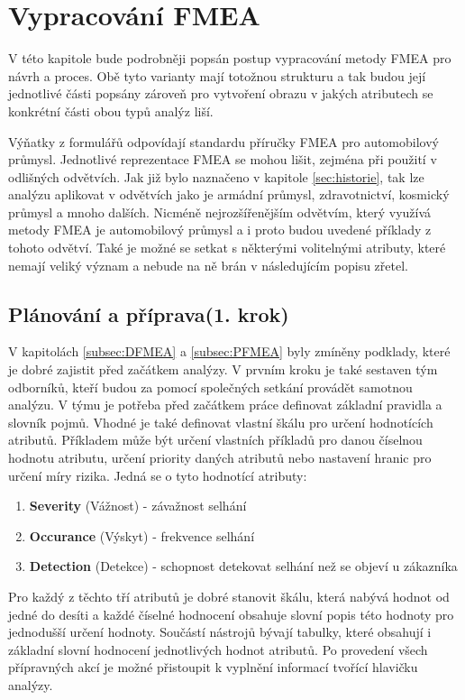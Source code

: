\chapter{Vypracování FMEA }
\label{sec:FMEA_postup}
V této kapitole bude podrobněji popsán postup vypracování metody FMEA pro návrh a proces. Obě tyto varianty mají totožnou strukturu a tak budou její jednotlivé části popsány zároveň pro vytvoření obrazu v jakých atributech se konkrétní části obou typů analýz liší. 

Výňatky z formulářů odpovídají standardu příručky FMEA pro automobilový průmysl. \cite{fmeaHandbook} Jednotlivé reprezentace FMEA se mohou lišit, zejména při použití v odlišných odvětvích. Jak již bylo naznačeno v kapitole \ref{sec:historie}, tak lze analýzu aplikovat v odvětvích jako je armádní průmysl, zdravotnictví, kosmický průmysl a mnoho dalších. Nicméně nejrozšířenějším odvětvím, který využívá metody FMEA je automobilový průmysl a i proto budou uvedené příklady z tohoto odvětví. \cite{fmeaExamples} Také je možné se setkat s některými volitelnými atributy, které nemají veliký význam a nebude na ně brán v následujícím popisu zřetel.  

\section{Plánování a příprava(1. krok)}
V kapitolách \ref{subsec:DFMEA} a \ref{subsec:PFMEA}  byly zmíněny podklady, které je dobré zajistit před začátkem analýzy. V prvním kroku je také sestaven tým odborníků, kteří budou za pomocí společných setkání provádět samotnou analýzu. V týmu je potřeba před začátkem práce definovat základní pravidla a slovník pojmů. Vhodné je také definovat vlastní škálu pro určení hodnotících atributů. Příkladem může být určení vlastních příkladů pro danou číselnou hodnotu atributu, určení priority daných atributů nebo nastavení hranic pro určení míry rizika. Jedná se o tyto hodnotící atributy: 

\begin{enumerate}
	\item \textbf{Severity} (Vážnost) - závažnost selhání
	\item \textbf{Occurance} (Výskyt) - frekvence selhání
	\item \textbf{Detection} (Detekce) - schopnost detekovat selhání než se objeví u zákazníka
\end{enumerate}

Pro každý z těchto tří atributů je dobré stanovit škálu, která nabývá hodnot od jedné do desíti a každé číselné hodnocení obsahuje slovní popis této hodnoty pro jednodušší určení hodnoty. Součástí nástrojů  bývají tabulky, které obsahují i základní slovní hodnocení jednotlivých hodnot atributů. Po provedení všech přípravných akcí je možné přistoupit k vyplnění informací tvořící hlavičku analýzy. 

